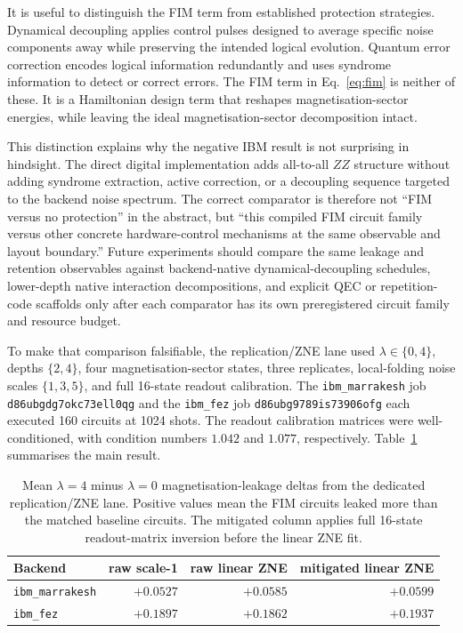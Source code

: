 \documentclass[preprint,aps,physrev,superscriptaddress,floatfix,longbibliography]{revtex4-2}
\begin{document}
It is useful to distinguish the FIM term from established protection
strategies. Dynamical decoupling applies control pulses designed to average
specific noise components away while preserving the intended logical
evolution. Quantum error correction encodes logical information redundantly
and uses syndrome information to detect or correct errors. The FIM term in
Eq.~\eqref{eq:fim} is neither of these. It is a Hamiltonian design term that
reshapes magnetisation-sector energies, while leaving the ideal
magnetisation-sector decomposition intact.

This distinction explains why the negative IBM result is not surprising in
hindsight. The direct digital implementation adds all-to-all $ZZ$ structure
without adding syndrome extraction, active correction, or a decoupling
sequence targeted to the backend noise spectrum. The correct comparator is
therefore not ``FIM versus no protection'' in the abstract, but ``this
compiled FIM circuit family versus other concrete hardware-control mechanisms
at the same observable and layout boundary.'' Future experiments should compare
the same leakage and retention observables against backend-native
dynamical-decoupling schedules, lower-depth native interaction decompositions,
and explicit QEC or repetition-code scaffolds only after each comparator has
its own preregistered circuit family and resource budget.

To make that comparison falsifiable, the replication/ZNE lane used
$\lambda\in\{0,4\}$, depths $\{2,4\}$, four magnetisation-sector states,
three replicates, local-folding noise scales $\{1,3,5\}$, and full 16-state
readout calibration. The \texttt{ibm\_marrakesh} job
\texttt{d86ubgdg7okc73ell0qg} and the \texttt{ibm\_fez} job
\texttt{d86ubg9789is73906ofg} each executed 160 circuits at 1024 shots. The
readout calibration matrices were well-conditioned, with condition numbers
$1.042$ and $1.077$, respectively. Table~\ref{tab:replicationzne}
summarises the main result.

\begin{table}[tb]
\centering
\small
\begin{tabular}{lrrr}
\toprule
Backend & raw scale-1 & raw linear ZNE & mitigated linear ZNE \\
\midrule
\texttt{ibm\_marrakesh} & $+0.0527$ & $+0.0585$ & $+0.0599$ \\
\texttt{ibm\_fez} & $+0.1897$ & $+0.1862$ & $+0.1937$ \\
\bottomrule
\end{tabular}
\caption{Mean $\lambda=4$ minus $\lambda=0$ magnetisation-leakage deltas
from the dedicated replication/ZNE lane. Positive values mean the FIM
circuits leaked more than the matched baseline circuits. The mitigated
column applies full 16-state readout-matrix inversion before the linear
ZNE fit.}
\label{tab:replicationzne}
\end{table}
\end{document}
